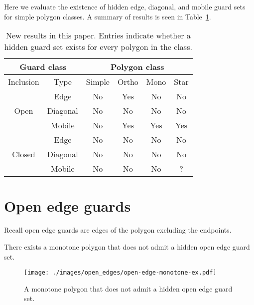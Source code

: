 \documentclass{cccg12}
\begin{document}
Here we evaluate the existence of hidden edge, diagonal, and mobile guard sets for simple polygon classes.
A summary of results is seen in Table~\ref{tab:results}.

\begin{table}[ht]
\centering
\begin{tabular}{|c|c|c|c|c|c|}
\hline 
\multicolumn{2}{|c|}{Guard class} & \multicolumn{4}{|c|}{Polygon class} \\
\hline
Inclusion & Type & Simple & Ortho & Mono & Star \\
\hline
     & Edge & No & Yes & No & No \\
\cline{2-6}
Open & Diagonal & No & No & No & No \\
\cline{2-6}
     & Mobile & No & Yes & Yes & Yes \\
\hline
     & Edge & No & No & No & No \\
\cline{2-6}
Closed & Diagonal & No & No & No & No \\
\cline{2-6}
     & Mobile & No & No & No & ? \\
\hline
\end{tabular}
\caption{New results in this paper. Entries indicate whether a hidden guard set exists for every polygon in the class.}
\label{tab:results}
\end{table}

\section{Open edge guards}

Recall open edge guards are edges of the polygon excluding the endpoints.

\begin{lemma}
There exists a monotone polygon that does not admit a hidden open edge guard set.
\end{lemma}

\begin{figure}[ht]
\centering
\texttt{[image: ./images/open\_edges/open-edge-monotone-ex.pdf]}
\caption{A monotone polygon that does not admit a hidden open edge guard set.}
\label{fig:open-edge-monotone-ex}
\end{figure}
\end{document}
